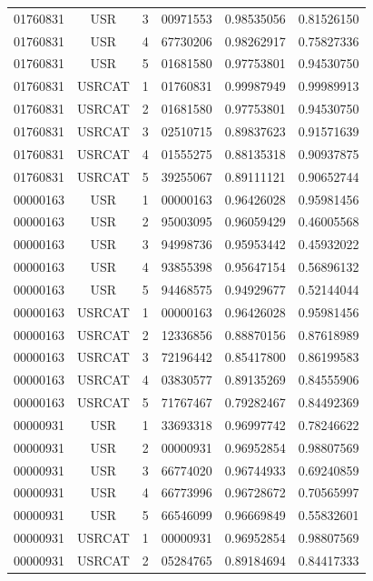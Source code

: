 \begin{longtable}{cccccc}
01760831 & USR    & 3 & 00971553 & 0.98535056 & 0.81526150\\
01760831 & USR    & 4 & 67730206 & 0.98262917 & 0.75827336\\
01760831 & USR    & 5 & 01681580 & 0.97753801 & 0.94530750\\
01760831 & USRCAT & 1 & 01760831 & 0.99987949 & 0.99989913\\%
01760831 & USRCAT & 2 & 01681580 & 0.97753801 & 0.94530750\\
01760831 & USRCAT & 3 & 02510715 & 0.89837623 & 0.91571639\\
01760831 & USRCAT & 4 & 01555275 & 0.88135318 & 0.90937875\\
01760831 & USRCAT & 5 & 39255067 & 0.89111121 & 0.90652744\\
\hline
00000163 & USR    & 1 & 00000163 & 0.96426028 & 0.95981456\\%
00000163 & USR    & 2 & 95003095 & 0.96059429 & 0.46005568\\
00000163 & USR    & 3 & 94998736 & 0.95953442 & 0.45932022\\
00000163 & USR    & 4 & 93855398 & 0.95647154 & 0.56896132\\
00000163 & USR    & 5 & 94468575 & 0.94929677 & 0.52144044\\
00000163 & USRCAT & 1 & 00000163 & 0.96426028 & 0.95981456\\%
00000163 & USRCAT & 2 & 12336856 & 0.88870156 & 0.87618989\\
00000163 & USRCAT & 3 & 72196442 & 0.85417800 & 0.86199583\\
00000163 & USRCAT & 4 & 03830577 & 0.89135269 & 0.84555906\\
00000163 & USRCAT & 5 & 71767467 & 0.79282467 & 0.84492369\\
\hline
00000931 & USR    & 1 & 33693318 & 0.96997742 & 0.78246622\\%
00000931 & USR    & 2 & 00000931 & 0.96952854 & 0.98807569\\
00000931 & USR    & 3 & 66774020 & 0.96744933 & 0.69240859\\
00000931 & USR    & 4 & 66773996 & 0.96728672 & 0.70565997\\
00000931 & USR    & 5 & 66546099 & 0.96669849 & 0.55832601\\
00000931 & USRCAT & 1 & 00000931 & 0.96952854 & 0.98807569\\%
00000931 & USRCAT & 2 & 05284765 & 0.89184694 & 0.84417333\\

\end{longtable}
